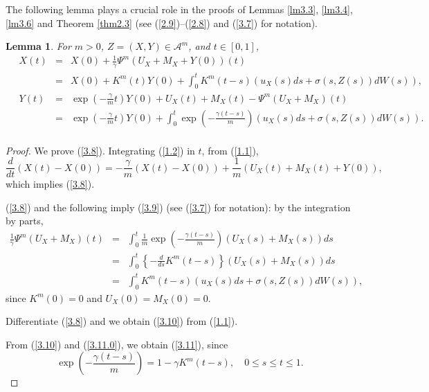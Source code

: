 \documentclass[12pt]{article}
\newtheorem{lemma}{Lemma}[section]
\begin{document}
The following lemma plays a crucial role in the proofs of Lemmas \ref{lm3.3}, \ref{lm3.4}, \ref{lm3.6} and  Theorem \ref{thm2.3} (see (\ref{2.9})--(\ref{2.8}) and (\ref{3.7}) for notation).

\begin{lemma}\label{lm3.2}
For $m>0$, $Z=(X,Y)\in \mathcal{A}^m$, and $t\in[0,1]$,
\begin{eqnarray}
\quad X(t)&=&X(0)+\frac{1}{\gamma}\Psi^{m} (U_X+M_X+Y(0))(t)\label{3.8}\\
&=&X(0)+K^m(t)Y(0)+\int_0^tK^m(t-s)(u_X(s)ds+ \sigma(s,Z(s))dW(s)),\label{3.9}\\
\quad Y(t)&=&\exp \left(-\frac{\gamma}{m}t\right)Y(0)+U_X(t)+M_X(t)-\Psi^{m} (U_X+M_X)(t)\label{3.10}\\
&=&\exp \left(-\frac{\gamma}{m}t\right)Y(0)+\int_{0}^{t}\exp\left(-\frac{\gamma (t-s)}{m}\right)(u_X(s)ds +\sigma(s,Z(s))dW(s)).\nonumber\\
\label{3.11}
\end{eqnarray}
\end{lemma}

\begin{proof}
We  prove (\ref{3.8}).
Integrating (\ref{1.2}) in $t$, from (\ref{1.1}),
\begin{equation*}
\frac{d}{dt} (X(t)-X(0))=-\frac{\gamma}{m} (X(t)-X(0))+\frac{1}{m}(U_X(t)+M_X(t)+Y(0)),
\end{equation*}
which implies  (\ref{3.8}).

(\ref{3.8}) and the following imply (\ref{3.9}) (see (\ref{3.7}) for notation): by the integration by parts,
\begin{eqnarray}\label{3.11.0}
\frac{1}{\gamma}\Psi^{m} (U_X+M_X)(t)&=&\int_0^t \frac{1}{m}\exp\left(-\frac{\gamma (t-s)}{m} \right)\left(U_X(s)+M_X(s)\right)ds\qquad\\
&=&\int_0^t \left\{-\frac{d}{ds}K^m(t-s)\right\}\left(U_X(s)+M_X(s)\right)ds\nonumber\\
&=&\int_0^t K^m(t-s)\left(u_X(s)ds+ \sigma(s,Z(s))dW(s)\right),\nonumber
\end{eqnarray}
since $K^m(0)=0$ and $U_X(0)=M_X(0)=0$.

Differentiate (\ref{3.8}) and we obtain (\ref{3.10}) from (\ref{1.1}).

From (\ref{3.10}) and (\ref{3.11.0}), we obtain  (\ref{3.11}), since
$$\exp\left(-\frac{\gamma (t-s)}{m}\right)=1-\gamma K^m(t-s),\quad 0\le s\le t\le 1.$$
\end{proof}
\end{document}
